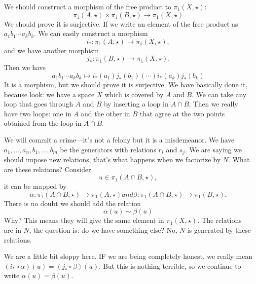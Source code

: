 We should construct a morphism of the free product to
$\pi_{1}(X,\star)$:
\begin{equation}
\pi_{1}(A,\star)\times\pi_{1}(B,\star)\to\pi_{1}(X,\star)
\end{equation}
We should prove it is surjective. If we write an element of the
free product as $a_1b_1\cdots a_kb_k$. We can easily construct a
morphism
\begin{equation}
i_*\colon\pi_1(A,\star)\to\pi_1(X,\star),
\end{equation}
and we have another morphism
\begin{equation}
j_*\colon\pi_{1}(B,\star)\to\pi_1(X,\star).
\end{equation}
Then we have
\begin{equation}
a_1b_1\cdots a_kb_k\mapsto i_*(a_1)j_*(b_1)(\cdots)
i_*(a_k)j_*(b_k)
\end{equation}
It is a morphism, but we should prove it is surjective. We have
basically done it, because look: we have a space $X$ which is
covered by $A$ and $B$. We can take any loop that goes through
$A$ and $B$ by inserting a loop in $A\cap B$. Then we really have
two loops: one in $A$ and the other in $B$ that agree at the two
points obtained from the loop in $A\cap B$.

We will commit a crime---it's not a felony but it is a
misdemeanor. We have $a_1,\dots,a_n,b_1,\dots,b_m$ be the
generators with relations $r_i$ and $s_j$. We are saying we should
impose new relations, that's what happens when we factorize by
$N$. What are these relations? Consider
\begin{equation}
u\in\pi_1(A\cap B,\star),
\end{equation}
it can be mapped by 
\begin{subequations}
\begin{equation}
\alpha\colon\pi_1(A\cap B,\star)\to\pi_1(A,\star)
\end{equation}
and
\begin{equation}
\beta\colon\pi_1(A\cap B,\star)\to\pi_1(B,\star).
\end{equation}
\end{subequations}
There is no doubt we should add the relation
\begin{equation}
\alpha(u)\sim\beta(u)
\end{equation}
Why? This means they will give the same element in $\pi_1(X,\star)$.
The relations are in $N$, the question is: do we have something
else? No, $N$ is generated by these relations.
\begin{danger}
We are a little bit sloppy here. IF we are being completely
honest, we really mean $(i_*\circ\alpha)(u)=(j_*\circ\beta)(u)$. 
But this is nothing terrible, so we continue to write
$\alpha(u)=\beta(u)$. 
\end{danger}

